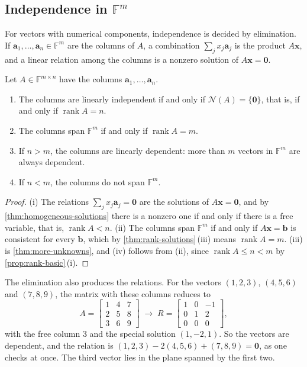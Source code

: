 \subsection{Independence in \texorpdfstring{$\mathbb F^m$}{F\^{}m}}

For vectors with numerical components, independence is decided by elimination. If $\mathbf a_1,\ldots,\mathbf a_n\in\mathbb F^m$ are the columns of $A$, a combination $\sum_jx_j\mathbf a_j$ is the product $A\mathbf x$, and a linear relation among the columns is a nonzero solution of $A\mathbf x=\mathbf 0$.

\begin{proposition}
\label{prop:independence-columns}
Let $A\in\mathbb F^{m\times n}$ have the columns $\mathbf a_1,\ldots,\mathbf a_n$.
\begin{enumerate}
\item The columns are linearly independent if and only if $\mathcal N(A)=\{\mathbf 0\}$, that is, if and only if $\operatorname{rank}A=n$.
\item The columns span $\mathbb F^m$ if and only if $\operatorname{rank}A=m$.
\item If $n>m$, the columns are linearly dependent: more than $m$ vectors in $\mathbb F^m$ are always dependent.
\item If $n<m$, the columns do not span $\mathbb F^m$.
\end{enumerate}
\end{proposition}

\begin{proof}
(i) The relations $\sum_jx_j\mathbf a_j=\mathbf 0$ are the solutions of $A\mathbf x=\mathbf 0$, and by \cref{thm:homogeneous-solutions} there is a nonzero one if and only if there is a free variable, that is, $\operatorname{rank}A<n$. (ii) The columns span $\mathbb F^m$ if and only if $A\mathbf x=\mathbf b$ is consistent for every $\mathbf b$, which by \cref{thm:rank-solutions}\,(iii) means $\operatorname{rank}A=m$. (iii) is \cref{thm:more-unknowns}, and (iv) follows from (ii), since $\operatorname{rank}A\le n<m$ by \cref{prop:rank-basic}\,(i).
\end{proof}

The elimination also produces the relations. For the vectors $(1,2,3)$, $(4,5,6)$ and $(7,8,9)$, the matrix with these columns reduces to
\[
A=\begin{bmatrix}1&4&7\\2&5&8\\3&6&9\end{bmatrix}\;\longrightarrow\;R=\begin{bmatrix}1&0&-1\\0&1&2\\0&0&0\end{bmatrix},
\]
with the free column $3$ and the special solution $(1,-2,1)$. So the vectors are dependent, and the relation is $(1,2,3)-2(4,5,6)+(7,8,9)=\mathbf 0$, as one checks at once. The third vector lies in the plane spanned by the first two.

